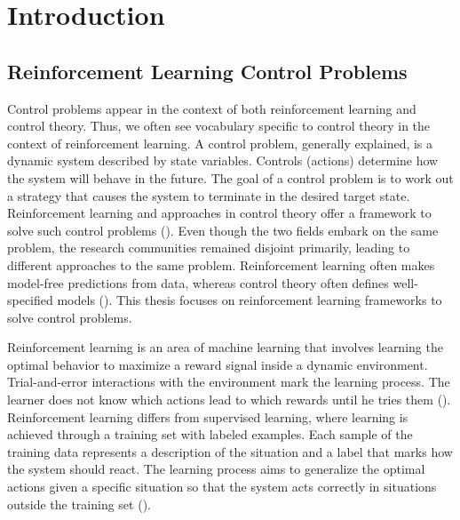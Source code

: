 
\chapter{Introduction}
\label{ch:introduction}


\section{Reinforcement Learning Control Problems}
Control problems appear in the context of both reinforcement learning and control theory. Thus, we often see vocabulary specific to control theory in the context of reinforcement learning. A control problem, generally explained, is a dynamic system described by state variables. Controls (actions) determine how the system will behave in the future. The goal of a control problem is to work out a strategy that causes the system to terminate in the desired target state. Reinforcement learning and approaches in control theory offer a framework to solve such control problems (\cite{bucsoniu2018reinforcement}). Even though the two fields embark on the same problem, the research communities remained disjoint primarily, leading to different approaches to the same problem. Reinforcement learning often makes model-free predictions from data, whereas control theory often defines well-specified models (\cite{recht2018tour}). This thesis focuses on reinforcement learning frameworks to solve control problems.

Reinforcement learning is an area of machine learning that involves learning the optimal behavior to maximize a reward signal inside a dynamic environment. Trial-and-error interactions with the environment mark the learning process. The learner does not know which actions lead to which rewards until he tries them (\cite{kaelbling1996reinforcement}). Reinforcement learning differs from supervised learning, where learning is achieved through a training set with labeled examples. Each sample of the training data represents a description of the situation and a label that marks how the system should react. The learning process aims to generalize the optimal actions given a specific situation so that the system acts correctly in situations outside the training set (\cite{sutton2018reinforcement}).

